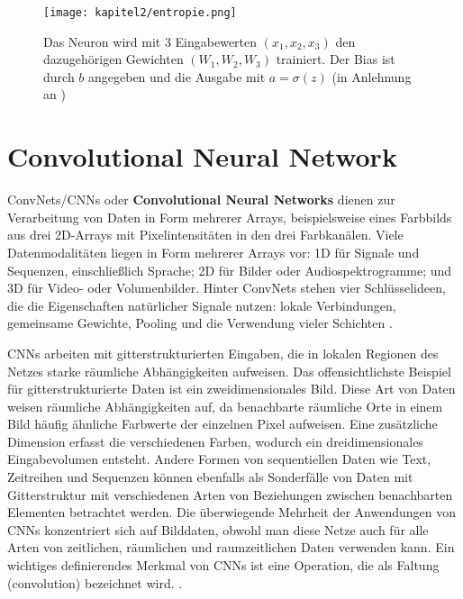     \begin{figure}[H]
        \centering
        \texttt{[image: kapitel2/entropie.png]}
        \caption[Darstellung der Kreuzentropie am beispiel eines Neurons]{Das Neuron wird mit 3 Eingabewerten $(x_1, x_2, x_3)$ den dazugehörigen Gewichten $(W_1, W_2, W_3)$ trainiert. Der Bias ist durch $b$ angegeben und die Ausgabe mit $a = \sigma(z)$ (in Anlehnung an \cite*{Nielsen2015})}
        \label{Kap2:Entropie}
    \end{figure}

    \section{Convolutional Neural Network}

    ConvNets/CNNs oder \textbf{Convolutional Neural Networks} dienen zur Verarbeitung von Daten in Form mehrerer Arrays, beispielsweise eines Farbbilds aus drei 2D-Arrays mit Pixelintensitäten in den drei Farbkanälen. Viele Datenmodalitäten liegen in Form mehrerer Arrays vor: 1D für Signale und Sequenzen, einschließlich Sprache; 2D für Bilder oder Audiospektrogramme; und 3D für Video- oder Volumenbilder. Hinter ConvNets stehen vier Schlüsselideen, die die Eigenschaften natürlicher Signale nutzen: lokale Verbindungen, gemeinsame Gewichte, Pooling und die Verwendung vieler Schichten \cite*{Lecun2015}.


    CNNs arbeiten mit gitterstrukturierten Eingaben, die in lokalen Regionen des Netzes starke räumliche Abhängigkeiten aufweisen. Das offensichtlichste Beispiel für gitterstrukturierte Daten ist ein zweidimensionales Bild. Diese Art von Daten weisen räumliche Abhängigkeiten auf, da benachbarte räumliche Orte in einem Bild häufig ähnliche Farbwerte der einzelnen Pixel aufweisen. Eine zusätzliche Dimension erfasst die verschiedenen Farben, wodurch ein dreidimensionales Eingabevolumen entsteht. Andere Formen von sequentiellen Daten wie Text, Zeitreihen und Sequenzen können ebenfalls als Sonderfälle von Daten mit Gitterstruktur mit verschiedenen Arten von Beziehungen zwischen benachbarten Elementen betrachtet werden. Die überwiegende Mehrheit der Anwendungen von CNNs konzentriert sich auf Bilddaten, obwohl man diese Netze auch für alle Arten von zeitlichen, räumlichen und raumzeitlichen Daten verwenden kann. Ein wichtiges definierendes Merkmal von CNNs ist eine Operation, die als Faltung (convolution) bezeichnet wird. \cite*[315-316]{Aggarwal2018}.




